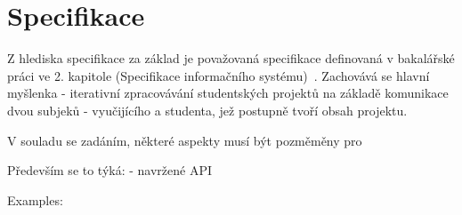 \chapter{Specifikace}\label{ch:specification}



Z hlediska specifikace za základ je považovaná specifikace definovaná v bakalářské práci ve 2. kapitole (Specifikace informačního systému)~\cite{bachelorthesis}.
Zachovává se hlavní myšlenka - iterativní zpracovávání studentských projektů na základě komunikace dvou subjeků - vyučijícího a studenta, jež postupně tvoří obsah projektu.


V souladu se zadáním, některé aspekty musí být pozměměny pro

Především se to týká:
- navržené \gls{API}

Examples:
